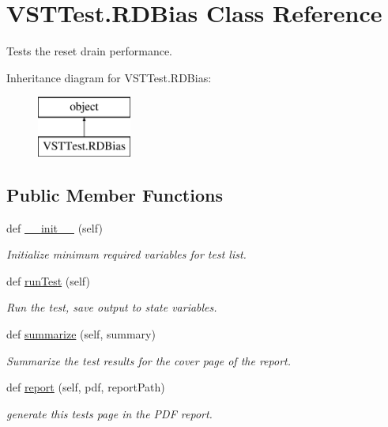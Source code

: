 \hypertarget{class_v_s_t_test_1_1_r_d_bias}{}\section{V\+S\+T\+Test.\+R\+D\+Bias Class Reference}
\label{class_v_s_t_test_1_1_r_d_bias}


Tests the reset drain performance.  


Inheritance diagram for V\+S\+T\+Test.\+R\+D\+Bias\+:\begin{figure}[H]
\begin{center}
\leavevmode
\includegraphics[height=2.000000cm]{class_v_s_t_test_1_1_r_d_bias}
\end{center}
\end{figure}
\subsection*{Public Member Functions}
\begin{DoxyCompactItemize}
\item 
def \hyperlink{class_v_s_t_test_1_1_r_d_bias_a40c667035a3b876fcc79fb2081ed4b56}{\+\_\+\+\_\+init\+\_\+\+\_\+} (self)
\begin{DoxyCompactList}\small\item\em Initialize minimum required variables for test list. \end{DoxyCompactList}\item 
def \hyperlink{class_v_s_t_test_1_1_r_d_bias_a93ed826cc1fdd7c1d850a585419821c7}{run\+Test} (self)
\begin{DoxyCompactList}\small\item\em Run the test, save output to state variables. \end{DoxyCompactList}\item 
def \hyperlink{class_v_s_t_test_1_1_r_d_bias_a2e3395c4c17e6f257193e00de4cadb33}{summarize} (self, summary)
\begin{DoxyCompactList}\small\item\em Summarize the test results for the cover page of the report. \end{DoxyCompactList}\item 
def \hyperlink{class_v_s_t_test_1_1_r_d_bias_ab53a33a86263b30f47c4b2945647f6cc}{report} (self, pdf, report\+Path)
\begin{DoxyCompactList}\small\item\em generate this test\textquotesingle{}s page in the P\+DF report. \end{DoxyCompactList}\end{DoxyCompactItemize}


